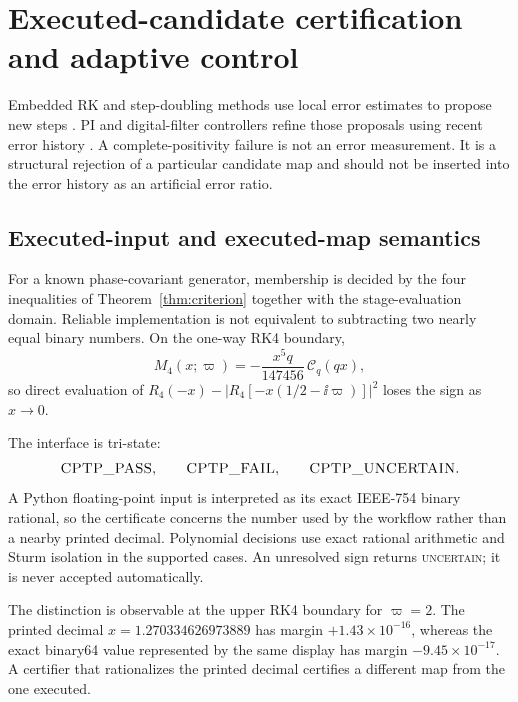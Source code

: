 \section{Executed-candidate certification and adaptive control}
\label{sec:stepcontrol}

Embedded RK and step-doubling methods use local error estimates to propose new steps \cite{DormandPrince1980,HairerNorsettWanner1993,Shampine1985Doubling}. PI and digital-filter controllers refine those proposals using recent error history \cite{Gustafsson1991,Soderlind2002,Soderlind2003}. A complete-positivity failure is not an error measurement. It is a structural rejection of a particular candidate map and should not be inserted into the error history as an artificial error ratio.

\subsection{Executed-input and executed-map semantics}

For a known phase-covariant generator, membership is decided by the four inequalities of Theorem~\ref{thm:criterion} together with the stage-evaluation domain. Reliable implementation is not equivalent to subtracting two nearly equal binary numbers. On the one-way RK4 boundary,
\begin{equation}
 M_4(x;\varpi)=-\frac{x^5q}{147456}\,\mathcal C_q(qx),
\end{equation}
so direct evaluation of $R_4(-x)-|R_4[-x(1/2-\ii\varpi)]|^2$ loses the sign as $x\to0$.

The interface is tri-state:
\begin{equation}
 \textsc{CPTP\_PASS},\qquad \textsc{CPTP\_FAIL},\qquad \textsc{CPTP\_UNCERTAIN}.
 \label{eq:tri_state}
\end{equation}
A Python floating-point input is interpreted as its exact IEEE-754 binary rational, so the certificate concerns the number used by the workflow rather than a nearby printed decimal. Polynomial decisions use exact rational arithmetic and Sturm isolation in the supported cases. An unresolved sign returns \textsc{uncertain}; it is never accepted automatically.

The distinction is observable at the upper RK4 boundary for $\varpi=2$. The printed decimal $x=1.270334626973889$ has margin $+1.43\times10^{-16}$, whereas the exact binary64 value represented by the same display has margin $-9.45\times10^{-17}$. A certifier that rationalizes the printed decimal certifies a different map from the one executed.

